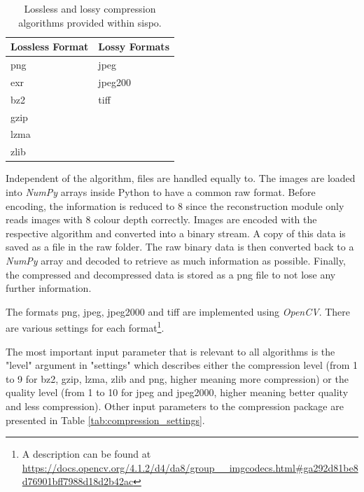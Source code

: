 \begin{table}[htpb]
\caption{Lossless and lossy compression algorithms provided within \gls{sispo}.}
\label{tab:compression_format}
\begin{tabular}{l|l}
\textbf{Lossless Format} & \textbf{Lossy Formats} \\ \hline
png               & jpeg           \\
exr               & jpeg200        \\
bz2               & tiff           \\
gzip              &                \\
lzma              &                \\
zlib              &               
\end{tabular}
\end{table}

Independent of the algorithm, files are handled equally to. The images are loaded into \textit{NumPy} arrays inside Python to have a common raw format. Before encoding, the information is reduced to \SI{8}{\bit} since the reconstruction module only reads images with \SI{8}{\bit} colour depth correctly. Images are encoded with the respective algorithm and converted into a binary stream. A copy of this data is saved as a file in the raw folder. The raw binary data is then converted back to a \textit{NumPy} array and decoded to retrieve as much information as possible. Finally, the compressed and decompressed data is stored as a png file to not lose any further information.

The formats png, jpeg, jpeg2000 and tiff are implemented using \textit{OpenCV}. There are various settings for each format\footnote{A description can be found at \url{https://docs.opencv.org/4.1.2/d4/da8/group__imgcodecs.html\#ga292d81be8d76901bff7988d18d2b42ac}}.

The most important input parameter that is relevant to all algorithms is the "level" argument in "settings" which describes either the compression level (from 1 to 9 for bz2, gzip, lzma, zlib and png, higher meaning more compression) or the quality level (from 1 to 10 for jpeg and jpeg2000, higher meaning better quality and less compression). Other input parameters to the compression package are presented in Table \ref{tab:compression_settings}.

